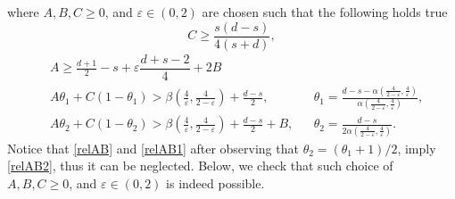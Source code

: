 \documentclass[aihp]{imsart}
\numberwithin{equation}{section}
\theoremstyle{plain}
\theoremstyle{remark}
\begin{document}
where $A, B, C \geq 0$, and $\varepsilon \in (0, 2)$ are chosen such that the following holds true
\begin{equation}\label{recc}
C \geq \frac{s(d-s)}{4(s+d)},
\end{equation} 
\begin{align}
\label{relAB}
& A\geq \frac{d+1}{2} -s +\varepsilon \dfrac{d+s-2}{4} +2B  \\
\label{relAB1}
& A\theta_1 +C (1-\theta_1)>\beta \left( \frac{4}{\varepsilon}, \frac{4}{2-\varepsilon}\right)+\frac{d-s}{2},&& \theta_1=\frac{d-s - \alpha (\frac{4}{2-\varepsilon},\frac{4}{\varepsilon})}{\alpha (\frac{4}{2-\varepsilon} ,\frac{4}{\varepsilon})}, \\
\label{relAB2}
& A\theta_2 +C(1-\theta_2 )> \beta \left(\frac{4}{\varepsilon}, \frac{4}{2-\varepsilon}\right) +\frac{d-s}{2} +B,&& \theta_2= \frac{d-s}{2\alpha  (\frac{4}{2-\varepsilon} ,\frac{4}{\varepsilon}) }. 
\end{align}
Notice that \eqref{relAB} and \eqref{relAB1} after observing that $\theta_2 = (\theta_1 + 1)/2$, imply  \eqref{relAB2}, thus it can be neglected. 
Below, we check that such choice of $A, B, C \geq 0$, and $\varepsilon \in (0, 2)$ is indeed possible.
\end{document}
